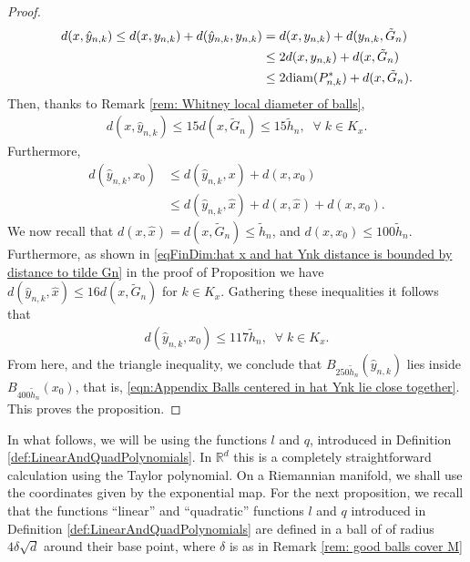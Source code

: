 \documentclass[11pt,reqno]{amsart}
\numberwithin{equation}{section}
\theoremstyle{plain}
\def\diam{\textnormal{diam}}
\begin{document}
\begin{proof}
  \begin{align*}
    d(x,\hat y_{n,k}) \leq d(x,y_{n,k})+d(\hat y_{n,k},y_{n,k}) & = d(x,y_{n,k})+d(y_{n,k},\tilde G_n)\\
	  & \leq 2d(x,y_{n,k})+d(x,\tilde G_n)\\
	  & \leq 2\diam(P_{n,k}^*)+d(x,\tilde G_n).
  \end{align*}
  Then, thanks to Remark \ref{rem: Whitney local diameter of balls}, 
  \begin{align*}
    d(x,\hat y_{n,k}) \leq 15 d(x,\tilde G_n)\leq 15 \tilde h_n,\;\;\forall\;k\in K_x.	  
  \end{align*}	  
  Furthermore,
  \begin{align*}
    d(\hat y_{n,k},x_0) & \leq d(\hat y_{n,k},x)+d(x,x_0)\\
	  & \leq d(\hat y_{n,k},\hat x)+d(x,\hat x)+d(x,x_0).
  \end{align*}
  We now recall that $d(x,\hat x) = d(x,\tilde G_n) \leq \tilde h_n$, and $d(x,x_0)\leq 100\tilde h_n$. Furthermore, as shown in \eqref{eqFinDim:hat x and hat Ynk distance is bounded by distance to tilde Gn} in the proof of Proposition  we have $d(\hat y_{n,k},\hat x) \leq 16 d(x,\tilde G_n)$ for $k\in K_x$. Gathering these inequalities it follows that
  \begin{align*}
    d(\hat y_{n,k},x_0)  \leq 117 \tilde h_n,\;\;\forall\;k\in K_x.
  \end{align*}   
  From here, and the triangle inequality, we conclude that $B_{250 \tilde h_n}(\hat y_{n,k})$ lies inside $B_{400\tilde h_n}(x_0)$, that is, \eqref{eqn:Appendix Balls centered in hat Ynk lie close together}. This proves the proposition.
\end{proof}

In what follows, we will be using the functions $l$ and $q$, introduced in Definition \ref{def:LinearAndQuadPolynomials}. In $\mathbb{R}^d$ this is a completely straightforward calculation using the Taylor polynomial.  On a Riemannian manifold, we shall use the coordinates given by the exponential map. For the next proposition, we recall that the functions ``linear'' and ``quadratic'' functions $l$ and $q$ introduced in Definition \ref{def:LinearAndQuadPolynomials} are defined in a ball of of radius $4\delta \sqrt{d}$ around their base point, where $\delta$ is as in Remark \ref{rem: good balls cover M}
\end{document}
